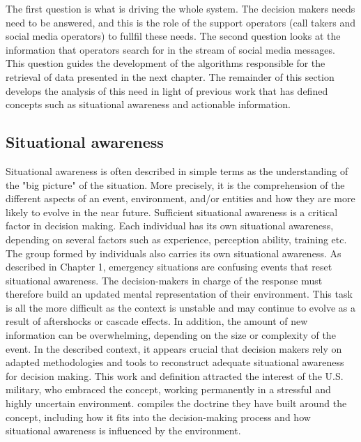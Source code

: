 The first question is what is driving the whole system.
The decision makers needs need to be answered, and this is the role of the support operators (call takers and social media operators) to fullfil these needs.
The second question looks at the information that operators search for in the stream of social media messages.
This question guides the development of the algorithms responsible for the retrieval of data presented in the next chapter.
The remainder of this section develops the analysis of this need in light of previous work that
has defined concepts such as situational awareness and actionable information.

\subsection{Situational awareness}
Situational awareness is often described in simple terms as the understanding of the "big picture" of the situation.
More precisely, it is the comprehension of the different aspects of an event, environment, and/or entities and how they are more likely to evolve in the near future.
Sufficient situational awareness is a critical factor in decision making.
Each individual has its own situational awareness, depending on several factors such as experience, perception ability, training etc.
The group formed by individuals also carries its own situational awareness.
As described in Chapter 1, emergency situations are confusing events that reset situational awareness.
The decision-makers in charge of the response must therefore build an updated mental representation of their environment.
This task is all the more difficult as the context is unstable and may continue to evolve as a result of aftershocks or cascade effects.
In addition, the amount of new information can be overwhelming, depending on the size or complexity of the event.
In the described context, it appears crucial that decision makers rely on adapted methodologies and tools to reconstruct adequate situational awareness for decision making.
This work and definition attracted the interest of the U.S. military, who embraced the concept, working permanently in a stressful and highly uncertain environment.
\textcite{ArmyPublishingDirectorate} compiles the doctrine they have built around the concept, including how it fits into the decision-making process and how situational awareness is influenced by the environment.

